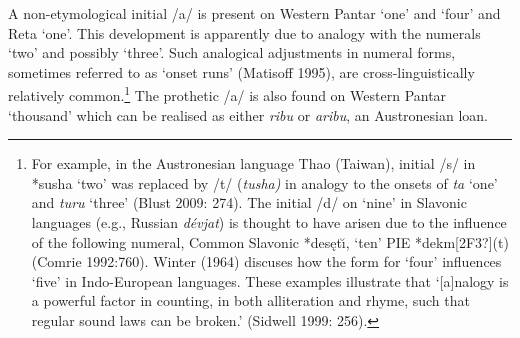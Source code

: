 A non-etymological initial /a/ is present on Western Pantar {\textquoteleft}one{\textquoteright} and {\textquoteleft}four{\textquoteright} and Reta {\textquoteleft}one{\textquoteright}. This development is apparently due to analogy with the numerals {\textquoteleft}two{\textquoteright} and possibly {\textquoteleft}three{\textquoteright}. Such analogical adjustments in numeral forms, sometimes referred to as {\textquoteleft}onset runs{\textquoteright} (Matisoff 1995), are cross-linguistically relatively common.\footnote{For example, in the Austronesian language Thao (Taiwan), initial /s/\textit{ }in *susha {\textquoteleft}two{\textquoteright} was replaced by /t/ (\textit{tusha) }in analogy to the onsets of \textit{ta }{\textquoteleft}one{\textquoteright} and \textit{turu }{\textquoteleft}three{\textquoteright} (Blust 2009: 274). The initial /d/ on {\textquoteleft}nine{\textquoteright} in Slavonic languages (e.g., Russian \textit{d\'evjat}) is thought to have arisen due to the influence of the following 
numeral, Common Slavonic *des\k{e}t\u{\i}, {\textquoteleft}ten{\textquoteright} PIE *dekm[2F3?](t) (Comrie 1992:760). Winter (1964) discuses how the form for {\textquoteleft}four{\textquoteright} influences {\textquoteleft}five{\textquoteright} in Indo-European languages. These examples illustrate that {\textquoteleft}[a]nalogy is a powerful factor in counting, in both alliteration and rhyme, such that regular sound laws can be broken.{\textquoteright} (Sidwell 1999: 256).} The prothetic /a/ is also found on Western Pantar {\textquoteleft}thousand{\textquoteright} which can be realised as either \textit{ribu} or \textit{aribu}, an Austronesian loan. 


